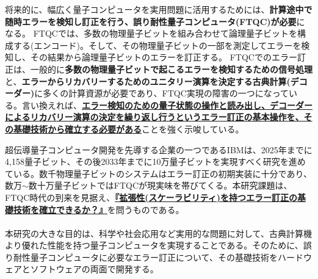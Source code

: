 \documentclass[11pt,a4j,dvipdfmx]{jarticle} 					%
\newcommand{\研究課題名}{誤り耐性量子コンピュータに向けた誤り訂正技術の開発(仮)}
\newcommand{\研究機関名}{東京大学}
\newcommand{\研究代表者氏名}{寺師弘二}
\newcommand{\研究期間の最終元号年度}{10}  %
\newcommand{\mybf}[1]{{\bfseries\sffamily#1}}
\begin{document}
将来的に、幅広く量子コンピュータを実用問題に活用するためには、\mybf{計算途中で随時エラーを検知し訂正を行う、誤り耐性量子コンピュータ(FTQC)が必要}になる。
FTQCでは、多数の物理量子ビットを組み合わせて論理量子ビットを構成する(エンコード)。そして、その物理量子ビットの一部を測定してエラーを検知し、その結果から論理量子ビットのエラーを訂正する。
FTQCでのエラー訂正は、一般的に\mybf{多数の物理量子ビットで起こるエラーを検知するための信号処理}と、\mybf{エラーからリカバリーするためのユニタリー演算を決定する古典計算(デコーダー)}に多くの計算資源が必要であり、FTQC実現の障害の一つになっている。言い換えれば、\mybf{\ul{エラー検知のための量子状態の操作と読み出し、デコーダーによるリカバリー演算の決定を繰り返し行うというエラー訂正の基本操作を、その基礎技術から確立する必要がある}}ことを強く示唆している。

超伝導量子コンピュータ開発を先導する企業の一つであるIBMは、2025年までに4,158量子ビット、その後2033年までに10万量子ビットを実現すべく研究を進めている。数千物理量子ビットのシステムはエラー訂正の初期実装に十分であり、数万$\sim$数十万量子ビットではFTQCが現実味を帯びてくる。本研究課題は、FTQC時代の到来を見据え、\mybf{\ul{『拡張性(スケーラビリティ)を持つエラー訂正の基礎技術を確立できるか？』}}を問うものである。\\

\\
本研究の大きな目的は、科学や社会応用など実用的な問題に対して、古典計算機より優れた性能を持つ量子コンピュータを実現することである。そのために、誤り耐性量子コンピュータに必要なエラー訂正について、その基礎技術をハードウェアとソフトウェアの両面で開発する。 \\
\end{document}
